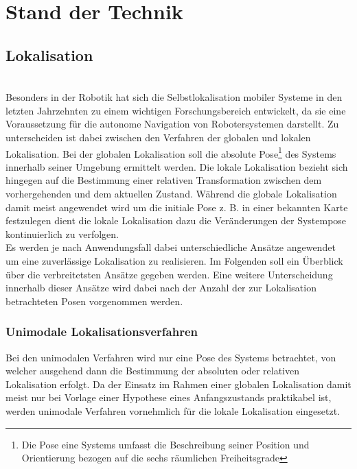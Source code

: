 \chapter{Stand der Technik}
\label{chap:tech}

\section{Lokalisation}
\label{chap:mcl}
\\
Besonders in der Robotik hat sich die Selbstlokalisation mobiler Systeme in den letzten Jahrzehnten zu einem wichtigen Forschungsbereich entwickelt, da sie eine Voraussetzung für die autonome Navigation von Robotersystemen darstellt.  Zu unterscheiden ist dabei zwischen den Verfahren der globalen und lokalen Lokalisation. Bei der globalen Lokalisation soll die absolute Pose\footnote{Die Pose eine Systems umfasst die Beschreibung seiner Position und Orientierung bezogen auf die sechs räumlichen Freiheitsgrade } des Systems innerhalb seiner Umgebung ermittelt werden. Die lokale Lokalisation bezieht sich hingegen auf die Bestimmung einer relativen Transformation zwischen dem vorhergehenden und dem aktuellen Zustand. Während die globale Lokalisation damit meist angewendet wird um die initiale Pose z. B. in einer bekannten Karte festzulegen dient die lokale Lokalisation dazu die Veränderungen der Systempose kontinuierlich zu verfolgen.\\
Es werden je nach Anwendungsfall dabei unterschiedliche Ansätze angewendet um eine zuverlässige Lokalisation zu realisieren. Im Folgenden soll ein Überblick über die verbreitetsten Ansätze gegeben werden. Eine weitere Unterscheidung innerhalb dieser Ansätze wird dabei nach der Anzahl der zur Lokalisation betrachteten Posen vorgenommen werden. 
\subsection{Unimodale Lokalisationsverfahren}
Bei den unimodalen Verfahren wird nur eine Pose des Systems betrachtet, von welcher ausgehend dann die Bestimmung der absoluten oder relativen Lokalisation erfolgt. Da der Einsatz im Rahmen einer globalen Lokalisation damit meist nur bei Vorlage einer \red[(sinnvollen)] Hypothese eines Anfangszustands praktikabel ist, werden unimodale Verfahren vornehmlich für die lokale Lokalisation eingesetzt. 

